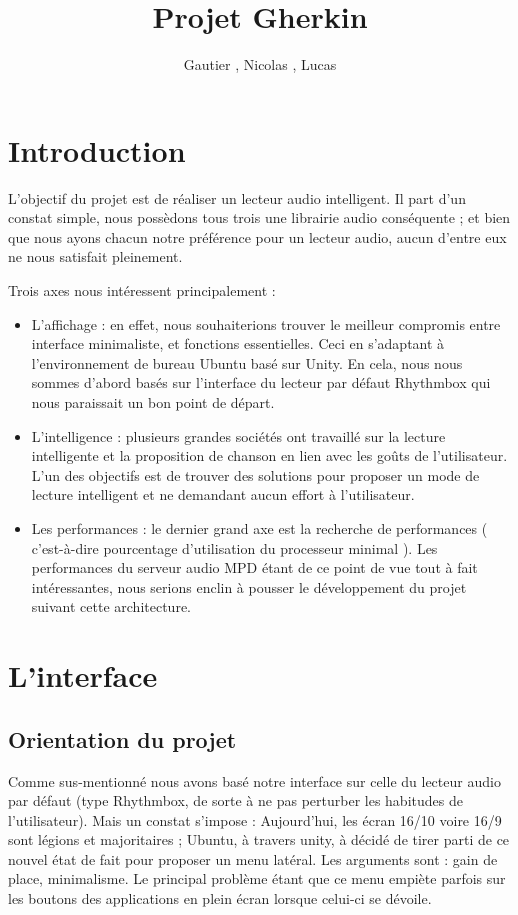 \documentclass{report}
\author{Gautier \bsc{Dakin}, Nicolas \bsc{Ehrhardt}, Lucas \bsc{Plaetevoet}}
\title{Projet Gherkin}
\begin{document}
\maketitle

\section*{Introduction}
L'objectif du projet est de réaliser un lecteur audio intelligent. Il part d'un constat simple, nous possèdons tous trois une librairie audio conséquente ; et bien que nous ayons chacun notre préférence pour un lecteur audio, aucun d'entre eux ne nous satisfait pleinement.

Trois axes nous intéressent principalement :
\begin{itemize}
\item L'affichage : en effet, nous souhaiterions trouver le meilleur compromis entre interface minimaliste, et fonctions essentielles. Ceci en s'adaptant à l'environnement de bureau Ubuntu basé sur Unity. En cela, nous nous sommes d'abord basés sur l'interface du lecteur par défaut Rhythmbox qui nous paraissait un bon point de départ.

\item L'intelligence : plusieurs grandes sociétés ont travaillé sur la lecture intelligente et la proposition de chanson en lien avec les goûts de l'utilisateur. L'un des objectifs est de trouver des solutions pour proposer un mode de lecture intelligent et ne demandant aucun effort à l'utilisateur.

\item Les performances : le dernier grand axe est la recherche de performances ( c'est-à-dire pourcentage d'utilisation du processeur minimal ). Les performances du serveur audio MPD étant de ce point de vue tout à fait intéressantes, nous serions enclin à pousser le développement du projet suivant cette architecture.
\end{itemize}

\section*{L'interface}
\subsection*{Orientation du projet}
Comme sus-mentionné nous avons basé notre interface sur celle du lecteur audio par défaut (type Rhythmbox, de sorte à ne pas perturber les habitudes de l'utilisateur). Mais un constat s'impose : Aujourd'hui, les écran 16/10 voire 16/9 sont légions et majoritaires ; Ubuntu, à travers unity, à décidé de tirer parti de ce nouvel état de fait pour proposer un menu latéral. Les arguments sont : gain de place, minimalisme. Le principal problème étant que ce menu empiète parfois sur les boutons des applications en plein écran lorsque celui-ci se dévoile.
\end{document}
